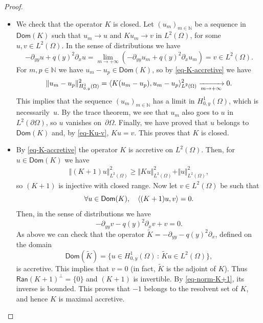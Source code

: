 \documentclass[11pt]{article}
\numberwithin{equation}{section}
\theoremstyle{plain}
\theoremstyle{definition}
\newcommand {\limt}[2]{\xrightarrow[#1 \to #2]{}}
\newcommand{\nr}[1]{\Vert #1\Vert}
\newcommand{\set}[1]{\{ #1\}}
\newcommand{\1}{\mathds 1}
\newcommand{\st}{\,:\,}
\let\Re\relax
\DeclareMathOperator{\Re}{\mathsf{Re}\mkern2mu}
\newcommand{\Dom}{\mathsf{Dom}}
\newcommand{\Ran}{\mathsf{Ran}}
\newcommand{\N}{\mathbb{N}}
\let\O\Omega
\begin{document}
\begin{proof}
\begin{itemize}
\item
We check that the operator $K$ is closed. Let $(u_m)_{m \in \N}$ be a sequence in $\Dom(K)$ such that $u_m \to u$ and $K u_m \to v$ in $L^2(\O)$, for some $u,v \in L^2(\O)$. In the sense of distributions we have
\begin{equation} \label{eq-Ku-v}
-\partial_{yy} u + q(y)^2 \partial_x u = \lim_{m \to +\infty} \left(-\partial_{yy} u_m + q(y)^2 \partial_x u_m \right) = v \in L^2(\O).
\end{equation}
For $m,p \in \N$ we have $u_m - u_p \in \Dom(K)$, so by \eqref{eq-K-accretive} we have
\begin{align*}
\nr{u_m - u_p}_{H^1_{0,y}(\O)}^2
= \Re \innp{K (u_m-u_p)}{u_m-u_p}_{L^2(\O)}^2
\limt m {+\infty} 0.
\end{align*}
This implies that the sequence $(u_m)_{m \in \N}$ has a limit in $H^1_{0,y}(\O)$, which is necessarily~$u$. By the trace theorem, we see that $u_m$ also goes to $u$ in $L^2(\partial\O)$, so $u$ vanishes on~$\partial \O$. Finally, we have proved that $u$ belongs to $\Dom(K)$ and, by \eqref{eq-Ku-v}, $Ku = v$. This proves that $K$ is closed.

\item
By \eqref{eq-K-accretive} the operator $K$ is accretive on $L^2(\O)$. Then, for $u \in \Dom(K)$ we have 
\begin{equation} \label{eq-norm-K+1}
\begin{aligned}
\nr{(K+1)u}_{L^2(\O)}^2 \geq \nr{Ku}_{L^2(\O)}^2 + \nr{u}_{L^2(\O)}^2,
\end{aligned}
\end{equation}
so $(K+1)$ is injective with closed range. Now let $v \in L^2(\O)$ be such that
\[
\forall u \in \Dom(K), \quad \innp{(K+1)u}{v} = 0.
\]
Then, in the sense of distributions we have
\[
-\partial_{yy} v - q(y)^2 \partial_x v + v = 0.
\]
As above we can check that the operator $\tilde K = -\partial_{yy} - q(y)^2 \partial_x$, defined on the domain
\[
\Dom(\tilde K) = \set{u \in H^1_{0,y}(\O) \st \tilde K u \in L^2(\O)},
\]
is accretive. This implies that $v = 0$ (in fact, $\tilde K$ is the adjoint of $K$). Thus \hbox{$\Ran(K+1)^\bot = \{0\}$} and $(K+1)$ is invertible. By \eqref{eq-norm-K+1}, its inverse is bounded. This proves that $-1$ belongs to the resolvent set of $K$, and hence $K$ is maximal accretive.\qedhere
\end{itemize}
\end{proof}
\end{document}
